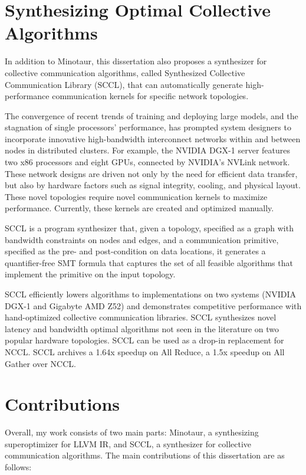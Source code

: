 \section{Synthesizing Optimal Collective Algorithms}

In addition to Minotaur, this dissertation also proposes a synthesizer
for collective communication algorithms, called Synthesized Collective
Communication Library (SCCL), that can automatically generate
high-performance communication kernels for specific network
topologies.

The convergence of recent trends of training and deploying large
models, and the stagnation of single processors' performance, has
prompted system designers to incorporate innovative high-bandwidth
interconnect networks within and between nodes in distributed
clusters.
%
For example, the NVIDIA DGX-1 server features two x86 processors and
eight GPUs, connected by NVIDIA's NVLink network.
%
These network designs are driven not only by the need for efficient
data transfer, but also by hardware factors such as signal integrity,
cooling, and physical layout.
%
These novel topologies require novel communication kernels to maximize
performance.
%
Currently, these kernels are created and optimized manually.

SCCL is a program synthesizer that, given a topology, specified as a
graph with bandwidth constraints on nodes and edges, and a
communication primitive, specified as the pre- and post-condition on
data locations, it generates a quantifier-free SMT formula that
captures the set of all feasible algorithms that implement the
primitive on the input topology.

SCCL efficiently lowers algorithms to implementations on two systems
(NVIDIA DGX-1 and Gigabyte AMD Z52) and demonstrates competitive
performance with hand-optimized collective communication libraries.
SCCL synthesizes novel latency and bandwidth optimal algorithms not
seen in the literature on two popular hardware topologies. SCCL can be
used as a drop-in replacement for NCCL. SCCL archives a 1.64x speedup
on All Reduce, a 1.5x speedup on All Gather over NCCL.



\section{Contributions}

Overall, my work consists of two main parts: Minotaur, a synthesizing
superoptimizer for LLVM IR, and SCCL, a synthesizer for collective
communication algorithms. The main contributions of this dissertation
are as follows:

